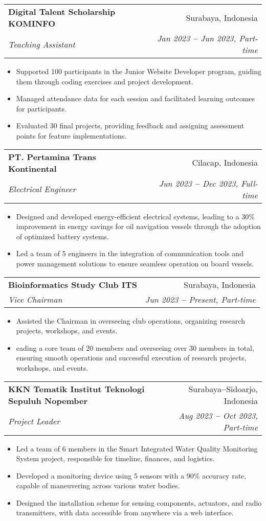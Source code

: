 \documentclass[letterpaper,11pt]{article}
\makeatletter
\newcommand{\resumeItem}[1]{
  \item\small{
    {#1 \vspace{-2pt}}
  }
}
\newcommand{\resumeSubheading}[4]{
  \vspace{-2pt}\item
    \begin{tabular*}{0.97\textwidth}[t]{l@{\extracolsep{\fill}}r}
      \textbf{#1} & #2 \\
      \textit{\small#3} & \textit{\small #4} \\
    \end{tabular*}\vspace{-7pt}
}
\newcommand{\resumeItemListStart}{\begin{itemize}}
\newcommand{\resumeItemListEnd}{\end{itemize}\vspace{-5pt}}
\makeatother
\begin{document}
    \resumeSubheading
      {Digital Talent Scholarship KOMINFO}{Surabaya, Indonesia}
      {Teaching Assistant}{Jan 2023 \textbf{--} Jun 2023, Part-time}
        \resumeItemListStart
            \resumeItem{Supported 100 participants in the Junior Website Developer program, guiding them through coding exercises and project development.}
            \resumeItem{Managed attendance data for each session and facilitated learning outcomes for participants.}
            \resumeItem{Evaluated 30 final projects, providing feedback and assigning assessment points for feature implementations.}
        \resumeItemListEnd


    \resumeSubheading
      {PT. Pertamina Trans Kontinental}{Cilacap, Indonesia}
      {Electrical Engineer}{Jun 2023 \textbf{--} Dec 2023, Full-time}
        \resumeItemListStart
            \resumeItem{Designed and developed energy-efficient electrical systems, leading to a 30\% improvement in energy savings for oil navigation vessels through the adoption of optimized battery systems.}
            \resumeItem{Led a team of 5 engineers in the integration of communication tools and power management solutions to ensure seamless operation on board vessels.}
    \resumeItemListEnd
    
    \resumeSubheading
      {Bioinformatics Study Club ITS}{Surabaya, Indonesia}
      {Vice Chairman}{Jun 2023 \textbf{--} Present, Part-time}
        \resumeItemListStart
            \resumeItem{Assisted the Chairman in overseeing club operations, organizing research projects, workshops, and events.}
            \resumeItem{eading a core team of 20 members and overseeing over 30 members in total, ensuring smooth operations and successful execution of research projects, workshops, and events.}
        \resumeItemListEnd

    \resumeSubheading
      {KKN Tematik Institut Teknologi Sepuluh Nopember}{Surabaya\textbf{--}Sidoarjo, Indonesia}
      {Project Leader}{Aug 2023 \textbf{--} Oct 2023, Part-time}
        \resumeItemListStart
            \resumeItem{Led a team of 6 members in the Smart Integrated Water Quality Monitoring System project, responsible for timeline, finances, and logistics.}
            \resumeItem{Developed a monitoring device using 5 sensors with a 90\% accuracy rate, capable of maneuvering across various water bodies.}
            \resumeItem{Designed the installation scheme for sensing components, actuators, and radio transmitters, with data accessible from anywhere via a web interface.}
        \resumeItemListEnd
        
\end{document}
